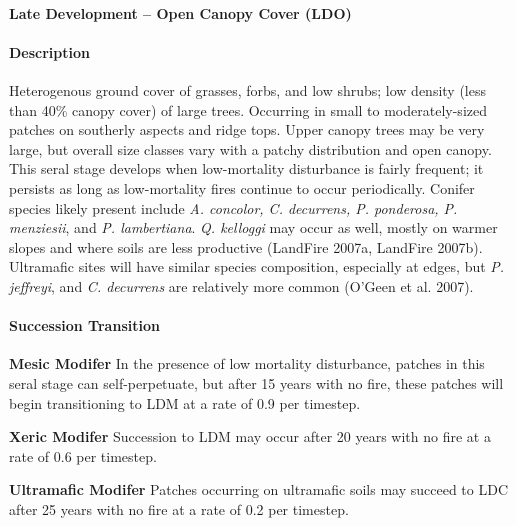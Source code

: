 \noindent\hrulefill


\paragraph{Late Development – Open Canopy Cover (LDO)}

\paragraph{Description} Heterogenous ground cover of grasses, forbs, and low shrubs; low density (less than 40\% canopy cover) of large trees. Occurring in small to moderately-sized patches on southerly aspects and ridge tops. Upper canopy trees may be very large, but overall size classes vary with a patchy distribution and open canopy. This seral stage develops when low-mortality disturbance is fairly frequent; it persists as long as low-mortality fires continue to occur periodically. Conifer species likely present include \emph{A. concolor, C. decurrens, P. ponderosa, P. menziesii}, and \emph{P. lambertiana}. \emph{Q. kelloggi} may occur as well, mostly on warmer slopes and where soils are less productive (LandFire 2007a, LandFire 2007b). Ultramafic sites will have similar species composition, especially at edges, but \emph{P. jeffreyi}, and \emph{C. decurrens} are relatively more common (O’Geen et al. 2007).


\paragraph{Succession Transition}
\begin{adjustwidth}{2cm}{}
\textbf{Mesic Modifer } In the presence of low mortality disturbance, patches in this seral stage can self-perpetuate, but after 15 years with no fire, these patches will begin transitioning to LDM at a rate of 0.9 per timestep.

\textbf{Xeric Modifer}  Succession to LDM may occur after 20 years with no fire at a rate of 0.6 per timestep. 

\textbf{Ultramafic Modifer} Patches occurring on ultramafic soils may succeed to LDC after 25 years with no fire at a rate of 0.2 per timestep.

\end{adjustwidth}

